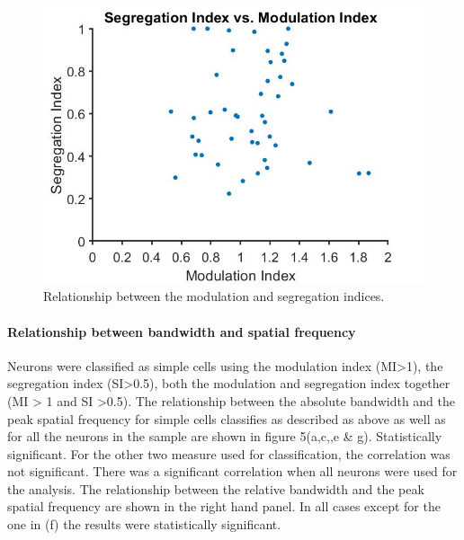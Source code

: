 	
	\begin{figure}[H]
		
		\includegraphics[width=\linewidth]{LinearV1/Segindvsmodind.jpg}
		\caption{Relationship between the modulation and segregation indices.}
		\label{fig:fig4}
	\end{figure}

	\paragraph{Relationship between bandwidth and spatial frequency}
	
	Neurons were classified as simple cells using the modulation index (MI>1), the segregation index (SI>0.5), both the modulation and segregation index together (MI > 1 and SI >0.5). The relationship between the absolute bandwidth and the peak spatial frequency for simple cells classifies as described as above as well as for all the neurons in the sample are shown in figure 5(a,c,,e \& g). Statistically significant. For the other two measure used for classification, the correlation was not significant. There was a significant correlation when all neurons were used for the analysis. The relationship between the relative bandwidth and the peak spatial frequency are shown in the right hand panel. In all cases except for the one in (f) the results were statistically significant.
	
